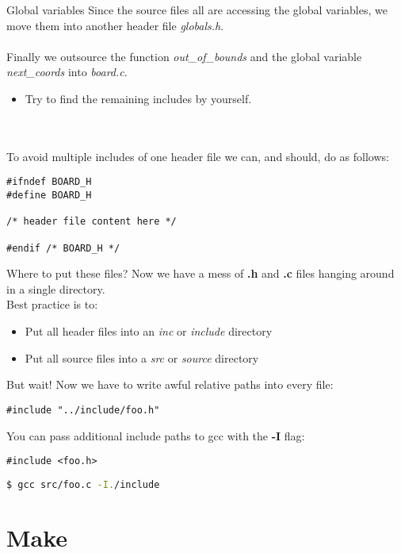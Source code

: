 \begin{frame}[fragile = singleslide]{Global variables}
	Since the source files all are accessing the global variables, we move them into another header file \textit{globals.h}.\\\ \\
	Finally we outsource the function \textit{out\_of\_bounds} and the global variable \textit{next\_coords} into \textit{board.c}.\\
	\begin{itemize}
		\item Try to find the remaining includes by yourself.
	\end{itemize}\ \\\ \\
	To avoid multiple includes of one header file we can, and should, do as follows:
	\begin{lstlisting}
#ifndef BOARD_H
#define BOARD_H

/* header file content here */

#endif /* BOARD_H */
\end{lstlisting}
\end{frame}

\begin{frame}[fragile = singleslide]{Where to put these files?}
Now we have a mess of \textbf{.h} and \textbf{.c} files hanging around in a single directory.\\
Best practice is to:
\begin{itemize}
	\item Put all header files into an \textit{inc} or \textit{include} directory
	\item Put all source files into a \textit{src} or \textit{source} directory
\end{itemize}
\pause
\bigskip
But wait! Now we have to write awful relative paths into every file:
\begin{lstlisting}
#include "../include/foo.h"
\end{lstlisting}
\pause
\bigskip
You can pass additional include paths to gcc with the \textbf{-I} flag:
\begin{lstlisting}
#include <foo.h>
\end{lstlisting}
\begin{lstlisting}[language=bash]
$ gcc src/foo.c -I./include
\end{lstlisting}

\end{frame}

\section{Make}
